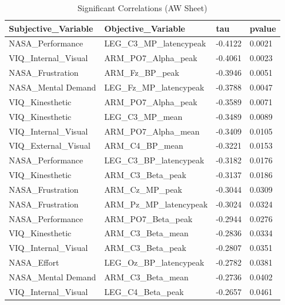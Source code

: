 \documentclass[10pt,letterpaper]{article}
\begin{document}
\begin{longtable}{@{}llll@{}}

\caption{Significant Correlations (AW Sheet)}
\label{tab:aw_correlations} \\

\toprule
\rowcolor[HTML]{EFEFEF} 
Subjective\_Variable & Objective\_Variable & tau & pvalue \\ \midrule


NASA\_Performance & LEG\_C3\_MP\_latencypeak & -0.4122 & 0.0021 \\
\rowcolor[HTML]{EFEFEF} 
VIQ\_Internal\_Visual & ARM\_PO7\_Alpha\_peak & -0.4061 & 0.0023 \\
NASA\_Frustration & ARM\_Fz\_BP\_peak & -0.3946 & 0.0051 \\
\rowcolor[HTML]{EFEFEF} 
NASA\_Mental Demand & LEG\_Fz\_MP\_latencypeak & -0.3788 & 0.0047 \\
VIQ\_Kinesthetic & ARM\_PO7\_Alpha\_peak & -0.3589 & 0.0071 \\
\rowcolor[HTML]{EFEFEF} 
VIQ\_Kinesthetic & LEG\_C3\_MP\_mean & -0.3489 & 0.0089 \\
VIQ\_Internal\_Visual & ARM\_PO7\_Alpha\_mean & -0.3409 & 0.0105 \\
\rowcolor[HTML]{EFEFEF} 
VIQ\_External\_Visual & ARM\_C4\_BP\_mean & -0.3221 & 0.0153 \\
NASA\_Performance & LEG\_C3\_BP\_latencypeak & -0.3182 & 0.0176 \\
\rowcolor[HTML]{EFEFEF} 
VIQ\_Kinesthetic & ARM\_C3\_Beta\_peak & -0.3137 & 0.0186 \\
NASA\_Frustration & ARM\_Cz\_MP\_peak & -0.3044 & 0.0309 \\
\rowcolor[HTML]{EFEFEF} 
NASA\_Frustration & ARM\_Pz\_MP\_latencypeak & -0.3024 & 0.0324 \\
NASA\_Performance & ARM\_PO7\_Beta\_peak & -0.2944 & 0.0276 \\
\rowcolor[HTML]{EFEFEF} 
VIQ\_Kinesthetic & ARM\_C3\_Beta\_mean & -0.2836 & 0.0334 \\
VIQ\_Internal\_Visual & ARM\_C3\_Beta\_peak & -0.2807 & 0.0351 \\
\rowcolor[HTML]{EFEFEF} 
NASA\_Effort & LEG\_Oz\_BP\_latencypeak & -0.2782 & 0.0381 \\
NASA\_Mental Demand & ARM\_C3\_Beta\_mean & -0.2736 & 0.0402 \\
\rowcolor[HTML]{EFEFEF} 
VIQ\_Internal\_Visual & LEG\_C4\_Beta\_peak & -0.2657 & 0.0461 \\

\end{longtable}
\end{document}
